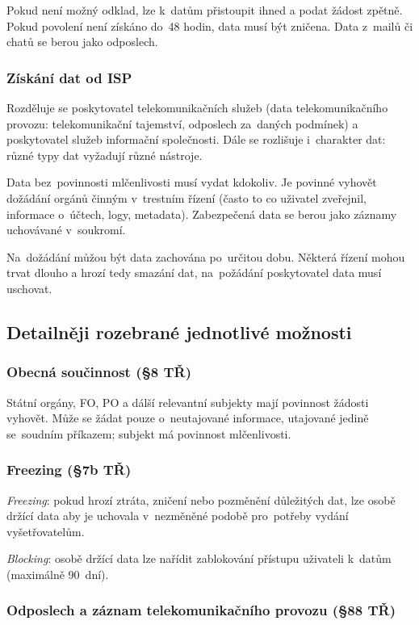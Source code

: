 Pokud není možný odklad, lze k~datům přistoupit ihned a podat žádost zpětně.
Pokud povolení není získáno do~48 hodin, data musí být zničena.
Data z~mailů či chatů se berou jako odposlech.


\subsubsection{Získání dat od ISP}

Rozděluje se poskytovatel telekomunikačních služeb (data telekomunikačního provozu: telekomunikační tajemství, odposlech za~daných podmínek) a poskytovatel služeb informační společnosti.
Dále se rozlišuje i~charakter dat: různé typy dat vyžadují různé nástroje.

Data bez~povinnosti mlčenlivosti musí vydat kdokoliv.
Je povinné vyhovět dožádání orgánů činným v~trestním řízení (často to co uživatel zveřejnil, informace o~účtech, logy, metadata).
Zabezpečená data se berou jako záznamy uchovávané v~soukromí.

Na~dožádání můžou být data zachována po~určitou dobu.
Některá řízení mohou trvat dlouho a hrozí tedy smazání dat, na~požádání poskytovatel data musí uschovat.


\subsection{Detailněji rozebrané jednotlivé možnosti}

\subsubsection{Obecná součinnost (§8 TŘ)}

Státní orgány, FO, PO a dálší relevantní subjekty mají povinnost žádosti vyhovět.
Může se žádat pouze o~neutajované informace, utajované jedině se~soudním příkazem; subjekt má povinnost mlčenlivosti.


\subsubsection{Freezing (§7b TŘ)}

\emph{Freezing}: pokud hrozí ztráta, zničení nebo pozměnění důležitých dat, lze osobě držící data aby je uchovala v~nezměněné podobě pro~potřeby vydání vyšetřovatelům.

\emph{Blocking}: osobě držící data lze nařídit zablokování přístupu uživateli k~datům (maximálně 90~dní).

\subsubsection{Odposlech a záznam telekomunikačního provozu (§88 TŘ)}


